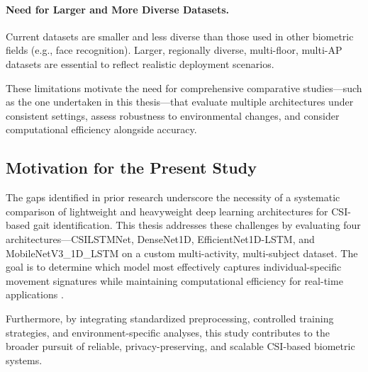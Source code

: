 \paragraph{Need for Larger and More Diverse Datasets.}
Current datasets are smaller and less diverse than those used in other biometric fields (e.g., face recognition). Larger, regionally diverse, multi-floor, multi-AP datasets are essential to reflect realistic deployment scenarios.

These limitations motivate the need for comprehensive comparative studies—such as the one undertaken in this thesis—that evaluate multiple architectures under consistent settings, assess robustness to environmental changes, and consider computational efficiency alongside accuracy.

\subsection{Motivation for the Present Study}

The gaps identified in prior research underscore the necessity of a systematic comparison of lightweight and heavyweight deep learning architectures for CSI-based gait identification. This thesis addresses these challenges by evaluating four architectures—CSILSTMNet, DenseNet1D, EfficientNet1D-LSTM, and MobileNetV3\_1D\_LSTM on a custom multi-activity, multi-subject dataset. The goal is to determine which model most effectively captures individual-specific movement signatures while maintaining computational efficiency for real-time applications \parencite{yang2023sensefi,li2025wifigeneralizability}.

Furthermore, by integrating standardized preprocessing, controlled training strategies, and environment-specific analyses, this study contributes to the broader pursuit of reliable, privacy-preserving, and scalable CSI-based biometric systems.

